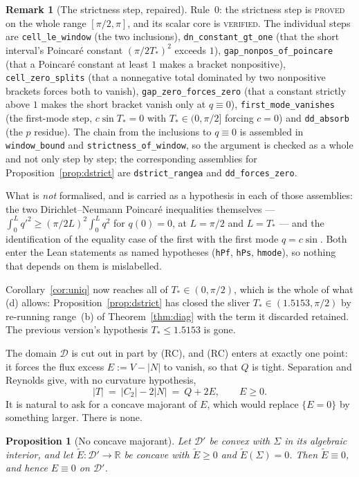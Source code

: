 \documentclass[11pt]{article}
\newtheorem{proposition}[theorem]{Proposition}
\theoremstyle{definition}
\newtheorem{remark}[theorem]{Remark}
\newcommand{\Sig}{\Sigma}
\begin{document}
\begin{remark}[The strictness step, repaired]
Rule~0: the strictness step is \textsc{proved} on the whole range $[\pi/2,\pi]$, and its
scalar core is \textsc{verified}. The individual steps are \verb|cell_le_window| (the two
inclusions), \verb|dn_constant_gt_one| (that the short interval's Poincar\'e constant
$(\pi/2T_\ast)^2$ exceeds $1$), \verb|gap_nonpos_of_poincare| (that a Poincar\'e constant at
least $1$ makes a bracket nonpositive), \verb|cell_zero_splits| (that a nonnegative total
dominated by two nonpositive brackets forces both to vanish), \verb|gap_zero_forces_zero|
(that a constant strictly above $1$ makes the short bracket vanish only at $q\equiv0$),
\verb|first_mode_vanishes| (the first-mode step, $c\sin T_\ast=0$ with $T_\ast\in(0,\pi/2]$
forcing $c=0$) and \verb|dd_absorb| (the $p$ residue). The chain from the inclusions to
$q\equiv0$ is assembled in \verb|window_bound| and \verb|strictness_of_window|, so the
argument is checked as a whole and not only step by step; the corresponding assemblies for
Proposition~\ref{prop:dstrict} are \verb|dstrict_rangea| and \verb|dd_forces_zero|.

What is \emph{not} formalised, and is carried as a hypothesis in each of those assemblies:
the two Dirichlet--Neumann Poincar\'e inequalities themselves --- $\int_0^Lq'^2\ge(\pi/2L)^2
\int_0^Lq^2$ for $q(0)=0$, at $L=\pi/2$ and $L=T_\ast$ --- and the identification of the
equality case of the first with the first mode $q=c\sin$. Both enter the Lean statements as
named hypotheses (\verb|hPf|, \verb|hPs|, \verb|hmode|), so nothing that depends on them is
mislabelled.

Corollary~\ref{cor:uniq} now reaches all of $T_\ast\in(0,\pi/2)$, which is the whole of what
(d) allows: Proposition~\ref{prop:dstrict} has closed the sliver $T_\ast\in(1.5153,\pi/2)$ by
re-running range~(b) of Theorem~\ref{thm:diag} with the term it discarded retained. The
previous version's hypothesis $T_\ast\le1.5153$ is gone.
\end{remark}

The domain $\mathcal D$ is cut out in part by (RC), and (RC) enters at exactly one
point: it forces the flux excess $E:=V-|N|$ to vanish, so that $Q$ is tight. Separation and
Reynolds give, with no curvature hypothesis,
\begin{equation}\label{eq:QplusE}
  |T|\ =\ |C_2|-2|N|\ =\ Q+2E,\qquad E\ge0 .
\end{equation}
It is natural to ask for a concave majorant of $E$, which would replace $\{E=0\}$ by
something larger. There is none.

\begin{proposition}[No concave majorant]\label{prop:nogo}
Let $\mathcal D'$ be convex with $\Sig$ in its algebraic interior, and let
$\widetilde E:\mathcal D'\to\mathbb R$ be concave with $\widetilde E\ge0$ and
$\widetilde E(\Sig)=0$. Then $\widetilde E\equiv0$, and hence $E\equiv0$ on $\mathcal D'$.
\end{proposition}
\end{document}
